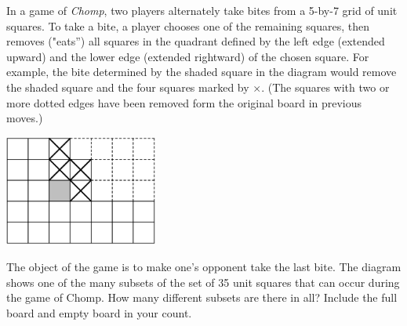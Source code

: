 In a game of \textit{Chomp}, two players alternately take bites from a 5-by-7 grid of unit squares. To take a bite, a player chooses one of the remaining squares, then removes ("eats'') all squares in the quadrant defined by the left edge (extended upward) and the lower edge (extended rightward) of the chosen square. For example, the bite determined by the shaded square in the diagram would remove the shaded square and the four squares marked by $\times.$ (The squares with two or more dotted edges have been removed form the original board in previous moves.)

\begin{center}
\includegraphics[width = 50.400000000000006mm]{img/fig0.png}
\end{center}

The object of the game is to make one's opponent take the last bite. The diagram shows one of the many subsets of the set of 35 unit squares that can occur during the game of Chomp. How many different subsets are there in all? Include the full board and empty board in your count.